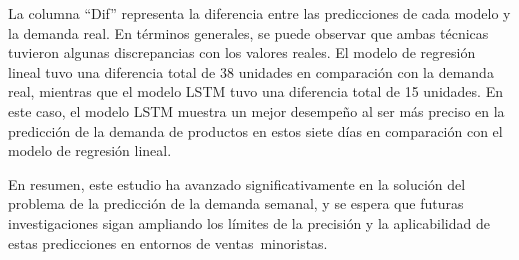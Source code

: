 \vspace{1\baselineskip}
La columna “Dif” representa la diferencia entre las predicciones de cada modelo y la demanda real. En términos generales, se puede observar que ambas técnicas tuvieron algunas discrepancias con los valores reales. El modelo de regresión lineal tuvo una diferencia total de 38 unidades en comparación con la demanda real, mientras que el modelo LSTM tuvo una diferencia total de 15 unidades. En este caso, el modelo LSTM muestra un mejor desempeño al ser más preciso en la predicción de la demanda de productos en estos siete días en comparación con el modelo de regresión lineal.

\vspace{1\baselineskip}
En resumen, este estudio ha avanzado significativamente en la solución del problema de la predicción de la demanda semanal, y se espera que futuras investigaciones sigan ampliando los límites de la precisión y la aplicabilidad de estas predicciones en entornos de ventas minoristas.






